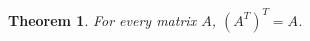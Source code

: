 \documentclass{article}
\newtheorem{theorem}{Theorem}
\begin{document}
\begin{theorem}
For every matrix $A$, $(A^{T})^{T}=A$.
\end{theorem}
\end{document}
